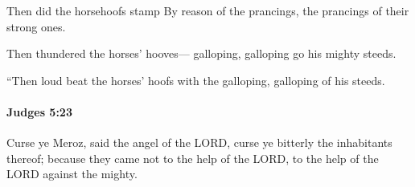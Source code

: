 			\begin{versebox}
					\item[BHS] 
					\item[ASV] Then did the horsehoofs stamp By reason of the prancings, the prancings of their strong ones.
					\item[NIV] Then thundered the horses’ hooves— galloping, galloping go his mighty steeds.
					\item[NRSV] “Then loud beat the horses’ hoofs with the galloping, galloping of his steeds.
			\end{versebox}

		\paragraph{Judges 5:23} %
			\label{JUDGES-5-23}

			Curse ye Meroz, said the angel of the LORD, curse ye bitterly the inhabitants thereof; because they came not to the help of the LORD, to the help of the LORD against the mighty.

